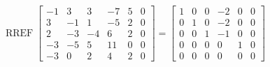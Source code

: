 \begin{exerciseAnswer} 


\[\operatorname{RREF} \left[\begin{array}{ccccc|c}
-1 & 3 & 3 & -7 & 5 & 0 \\
3 & -1 & 1 & -5 & 2 & 0 \\
2 & -3 & -4 & 6 & 2 & 0 \\
-3 & -5 & 5 & 11 & 0 & 0 \\
-3 & 0 & 2 & 4 & 2 & 0
\end{array}\right] = \left[\begin{array}{ccccc|c}
1 & 0 & 0 & -2 & 0 & 0 \\
0 & 1 & 0 & -2 & 0 & 0 \\
0 & 0 & 1 & -1 & 0 & 0 \\
0 & 0 & 0 & 0 & 1 & 0 \\
0 & 0 & 0 & 0 & 0 & 0
\end{array}\right] \]



\end{exerciseAnswer}
